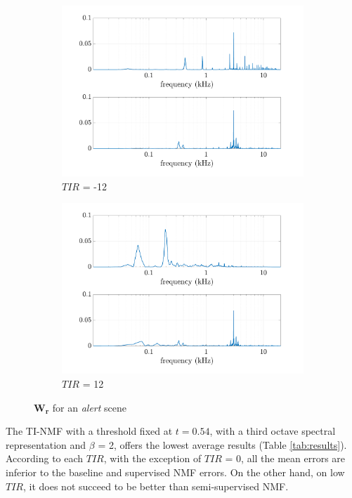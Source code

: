 \documentclass[twocolumn,a4paper,10pt]{article}
\begin{document}
\begin{figure}
    \centering
    \begin{subfigure}[t]{0.45\textwidth}
        \centering
        \includegraphics[width=\linewidth]{figures/Y_alert_TPR_-12_01.pdf}
        \caption{$TIR$ = -12}
        \label{fig:Y_alert-12}
    \end{subfigure}%
    \hfill
    \begin{subfigure}[t]{0.45\textwidth}
        \centering
        \includegraphics[width=\linewidth]{figures/Y_alert_TPR_12_01.pdf}
        \caption{$TIR$ = 12}
		\label{fig:Y_alert_12}
    \end{subfigure}
    \caption{$\mathbf{W_r}$ for an \textit{alert} scene}
\end{figure}


The TI-NMF with a threshold fixed at $t = 0.54$, with a third octave spectral representation and $\beta$ = 2,  offers the lowest average results (Table \ref{tab:results}). According to each $TIR$, with the exception of $TIR$ = 0, all the mean errors are inferior to the baseline and supervised NMF errors. On the other hand, on low $TIR$, it does not succeed to be better than semi-supervised NMF.
\end{document}
